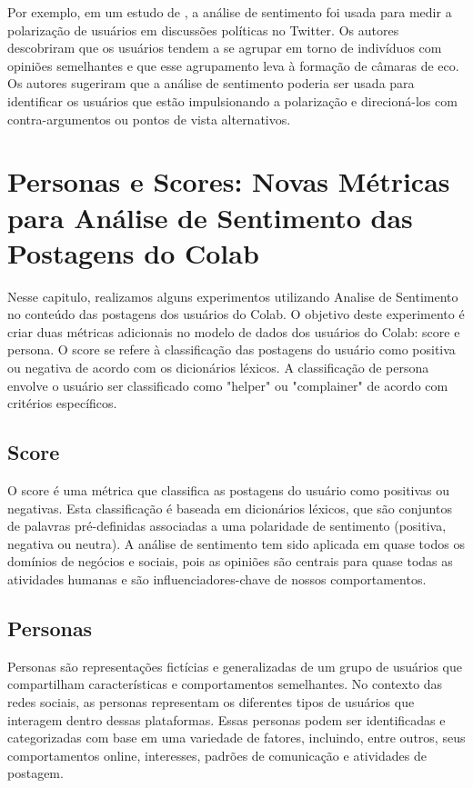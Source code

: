 Por exemplo, em um estudo de , a análise de sentimento foi usada para medir a polarização de usuários em discussões políticas no Twitter. Os autores descobriram que os usuários tendem a se agrupar em torno de indivíduos com opiniões semelhantes e que esse agrupamento leva à formação de câmaras de eco. Os autores sugeriram que a análise de sentimento poderia ser usada para identificar os usuários que estão impulsionando a polarização e direcioná-los com contra-argumentos ou pontos de vista alternativos.

\section{Personas e Scores: Novas Métricas para Análise de Sentimento das Postagens do Colab}

Nesse capitulo, realizamos alguns experimentos utilizando Analise de Sentimento no conteúdo das postagens dos usuários do Colab. O objetivo deste experimento é criar duas métricas adicionais no modelo de dados dos usuários do Colab: score e persona. O score se refere à classificação das postagens do usuário como positiva ou negativa de acordo com os dicionários léxicos. A classificação de persona envolve o usuário ser classificado como "helper" ou "complainer" de acordo com critérios específicos.

\subsection*{Score}
O score é uma métrica que classifica as postagens do usuário como positivas ou negativas. Esta classificação é baseada em dicionários léxicos, que são conjuntos de palavras pré-definidas associadas a uma polaridade de sentimento (positiva, negativa ou neutra). A análise de sentimento tem sido aplicada em quase todos os domínios de negócios e sociais, pois as opiniões são centrais para quase todas as atividades humanas e são influenciadores-chave de nossos comportamentos.

\subsection*{Personas}

Personas são representações fictícias e generalizadas de um grupo de usuários que compartilham características e comportamentos semelhantes. No contexto das redes sociais, as personas representam os diferentes tipos de usuários que interagem dentro dessas plataformas. Essas personas podem ser identificadas e categorizadas com base em uma variedade de fatores, incluindo, entre outros, seus comportamentos online, interesses, padrões de comunicação e atividades de postagem.

